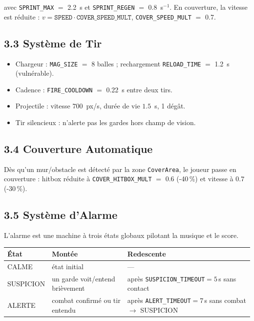 \documentclass[11pt,a4paper]{article}
\newcommand{\code}[1]{\colorbox{codebg}{\texttt{#1}}}
\newcommand{\param}[2]{\code{#1} $=$ #2}
\begin{document}
avec \param{SPRINT\_MAX}{2.2}~s et \param{SPRINT\_REGEN}{0.8}~s$^{-1}$.
En couverture, la vitesse est r\'eduite : $v = \texttt{SPEED}\cdot\texttt{COVER\_SPEED\_MULT}$,
\param{COVER\_SPEED\_MULT}{0.7}.

\subsection{3.3 Syst\`eme de Tir}
\begin{itemize}[leftmargin=*]
  \item Chargeur : \param{MAG\_SIZE}{8} balles ; rechargement \param{RELOAD\_TIME}{1.2}~s (vuln\'erable).
  \item Cadence : \param{FIRE\_COOLDOWN}{0.22}~s entre deux tirs.
  \item Projectile : vitesse $700$~px/s, dur\'ee de vie $1.5$~s, 1 d\'eg\^at.
  \item Tir silencieux : n'alerte pas les gardes hors champ de vision.
\end{itemize}

\subsection{3.4 Couverture Automatique}
D\`es qu'un mur/obstacle est d\'etect\'e par la zone \code{CoverArea}, le joueur
passe en couverture : hitbox r\'eduite \`a \param{COVER\_HITBOX\_MULT}{0.6} (-40\,\%)
et vitesse \`a $0.7$ (-30\,\%).

\subsection{3.5 Syst\`eme d'Alarme}
L'alarme est une machine \`a trois \'etats globaux pilotant la musique et le score.

\begin{center}
\begin{tabular}{lll}
\toprule
\textbf{\'Etat} & \textbf{Mont\'ee} & \textbf{Redescente} \\
\midrule
CALME & \'etat initial & --- \\
SUSPICION & un garde voit/entend bri\`evement & apr\`es \texttt{SUSPICION\_TIMEOUT}$=5$\,s sans contact \\
ALERTE & combat confirm\'e ou tir entendu & apr\`es \texttt{ALERT\_TIMEOUT}$=7$\,s sans combat $\to$ SUSPICION \\
\bottomrule
\end{tabular}
\end{center}
\end{document}
